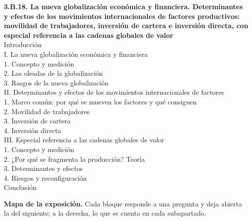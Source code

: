 \documentclass[11pt]{article}
\begin{document}
\begin{esquema}
\textbf{3.B.18. La nueva globalización económica y financiera. Determinantes y efectos de los movimientos internacionales de factores productivos: movilidad de trabajadores, inversión de cartera e inversión directa, con especial referencia a las cadenas globales de valor}\\[2pt]
Introducción\\
I. La nueva globalización económica y financiera\\
\hspace*{1.5em}1. Concepto y medición\\
\hspace*{1.5em}2. Las oleadas de la globalización\\
\hspace*{1.5em}3. Rasgos de la nueva globalización\\
II. Determinantes y efectos de los movimientos internacionales de factores\\
\hspace*{1.5em}1. Marco común: por qué se mueven los factores y qué consiguen\\
\hspace*{1.5em}2. Movilidad de trabajadores\\
\hspace*{1.5em}3. Inversión de cartera\\
\hspace*{1.5em}4. Inversión directa\\
III. Especial referencia a las cadenas globales de valor\\
\hspace*{1.5em}1. Concepto y medición\\
\hspace*{1.5em}2. ¿Por qué se fragmenta la producción? Teoría\\
\hspace*{1.5em}3. Determinantes y efectos\\
\hspace*{1.5em}4. Riesgos y reconfiguración\\
Conclusión
\end{esquema}

\begin{anotaciones}
\textbf{Mapa de la exposición.} Cada bloque responde a una pregunta y deja abierta la del siguiente; a la derecha, lo que se cuenta en cada subapartado.
\begin{infografiacaja}
\caption{Mapa del tema: la pregunta de cada bloque, sus subapartados y el hilo que los une}\label{figu:mapa-tema}
\end{infografiacaja}
\end{anotaciones}
\end{document}
